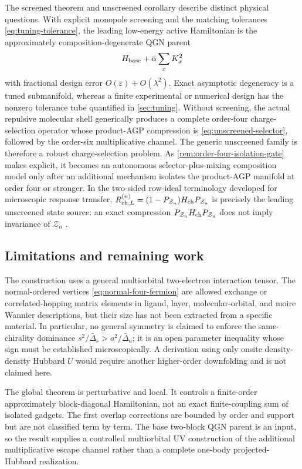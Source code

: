 \documentclass[11pt]{article}
\theoremstyle{definition}
\theoremstyle{remark}
\begin{document}
The screened theorem and unscreened corollary describe distinct physical questions.  With explicit monopole screening and the matching tolerances \eqref{eq:tuning-tolerance}, the leading low-energy active Hamiltonian is the approximately composition-degenerate QGN parent
\begin{equation}
 H_{\rm base}+\bar\alpha\sum_xK_x^2
\end{equation}
with fractional design error $O(\varepsilon)+O(\lambda^2)$.  Exact asymptotic degeneracy is a tuned submanifold, whereas a finite experimental or numerical design has the nonzero tolerance tube quantified in \cref{sec:tuning}.  Without screening, the actual repulsive molecular shell generically produces a complete order-four charge-selection operator whose product-AGP compression is \eqref{eq:unscreened-selector}, followed by the order-six multiplicative channel.  The generic unscreened family is therefore a robust charge-selection problem.  As \cref{rem:order-four-isolation-gate} makes explicit, it becomes an autonomous selector-plus-mixing composition model only after an additional mechanism isolates the product-AGP manifold at order four or stronger.
In the two-sided row-ideal terminology developed for microscopic response transfer, $R_{{\rm ch},L}^{(n)}=(1-P_{\mathcal Z_n})H_{\rm ch}P_{\mathcal Z_n}$ is precisely the leading unscreened state source: an exact compression $P_{\mathcal Z_n}H_{\rm ch}P_{\mathcal Z_n}$ does not imply invariance of $\mathcal Z_n$ \cite{SledgianowskiMeissnerTransfer}.

\subsection{Limitations and remaining work}

The construction uses a general multiorbital two-electron interaction tensor.  The normal-ordered vertices \eqref{eq:normal-four-fermion} are allowed exchange or correlated-hopping matrix elements in ligand, layer, molecular-orbital, and moire Wannier descriptions, but their size has not been extracted from a specific material.  In particular, no general symmetry is claimed to enforce the same-chirality dominance $s^2/\bar\Delta_s>a^2/\bar\Delta_a$; it is an open parameter inequality whose sign must be established microscopically.  A derivation using only onsite density-density Hubbard $U$ would require another higher-order downfolding and is not claimed here.

The global theorem is perturbative and local.  It controls a finite-order approximately block-diagonal Hamiltonian, not an exact finite-coupling sum of isolated gadgets.  The first overlap corrections are bounded by order and support but are not classified term by term.  The base two-block QGN parent is an input, so the result supplies a controlled multiorbital UV construction of the additional multiplicative escape channel rather than a complete one-body projected-Hubbard realization.
\end{document}
